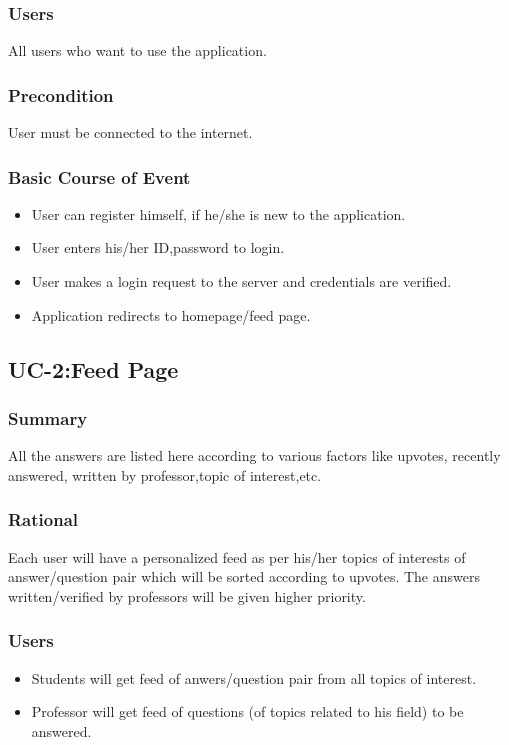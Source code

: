 \documentclass[12pt]{article}
\begin{document}
\subsubsection{Users}
All users who want to use the application.
\subsubsection{Precondition}
User must be connected to the internet.
\subsubsection{Basic Course of Event}
\begin{itemize}
\item User can register himself, if he/she is new to the application.
\item User enters his/her ID,password to login.
\item User makes a login request to the server and credentials are verified.
\item Application redirects to homepage/feed page.
\end{itemize}

\subsection{UC-2:Feed Page}
\subsubsection{Summary}
All the answers are listed here according to various factors like upvotes, recently answered, written by professor,topic of interest,etc.
\subsubsection{Rational}
Each user will have a personalized feed as per his/her topics of interests of answer/question pair which will be sorted according to upvotes. The answers written/verified by professors will be given higher priority.
\subsubsection{Users}
\begin{itemize}
\item Students will get feed of anwers/question pair from all topics of interest.
\item Professor will get feed of questions (of topics related to his field) to be answered.
\end{itemize}
\end{document}
